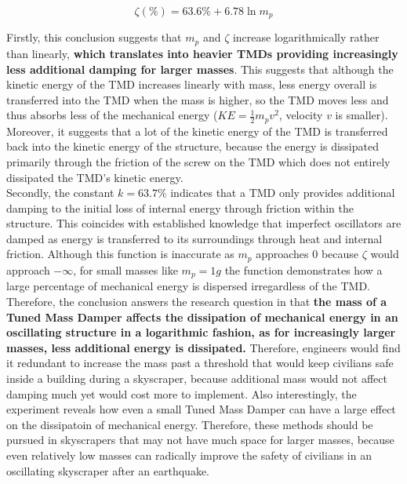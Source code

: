\documentclass[11pt]{article}
\begin{document}
$$\zeta (\%) = 63.6\% + 6.78\ln m_p$$

Firstly, this conclusion suggests that $m_p$ and $\zeta$ increase logarithmically rather than linearly, \textbf{which translates into heavier TMDs providing increasingly less additional damping for larger masses}. This suggests that although the kinetic energy of the TMD increases linearly with mass, less energy overall is transferred into the TMD when the mass is higher, so the TMD moves less and thus absorbs less of the mechanical energy ($KE=\frac{1}{2}m_pv^2$, velocity $v$ is smaller). Moreover, it suggests that a lot of the kinetic energy of the TMD is transferred back into the kinetic energy of the structure, because the energy is dissipated primarily through the friction of the screw on the TMD which does not entirely dissipated the TMD's kinetic energy. \\


Secondly, the constant $k=63.7\%$ indicates that a TMD only provides additional damping to the initial loss of internal energy through friction within the structure. This coincides with established knowledge that imperfect oscillators are damped as energy is transferred to its surroundings through heat and internal friction. Although this function is inaccurate as $m_p$ approaches 0 because $\zeta$ would approach $-\infty$, for small masses like $m_p = 1g$ the function demonstrates how a large percentage of mechanical energy is dispersed irregardless of the TMD. \\


Therefore, the conclusion answers the research question in that \textbf{the mass of a Tuned Mass Damper affects the dissipation of mechanical energy in an oscillating structure in a logarithmic fashion, as for increasingly larger masses, less additional energy is dissipated.} Therefore, engineers would find it redundant to increase the mass past a threshold that would keep civilians safe inside a building during a skyscraper, because additional mass would not affect damping much yet would cost more to implement. Also interestingly, the experiment reveals how even a small Tuned Mass Damper can have a large effect on the dissipatoin of mechanical energy. Therefore, these methods should be pursued in skyscrapers that may not have much space for larger masses, because even relatively low masses can radically improve the safety of civilians in an oscillating skyscraper after an earthquake. 

\end{document}

